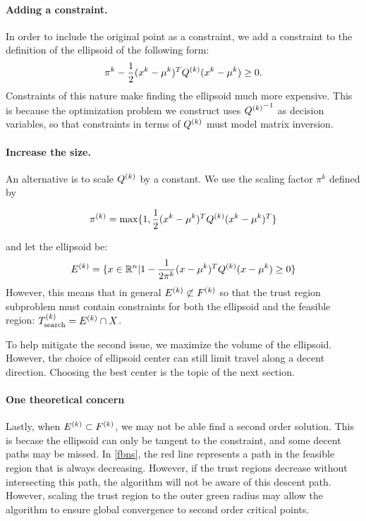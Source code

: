 
\paragraph{Adding a constraint.}
In order to include the original point as a constraint, we add a constraint to the definition of the ellipsoid of the following form:
$$ \pi^k - \frac 1 2 (x^k - \mu^{k})^T{Q^{(k)}}(x^k - \mu^{k}) \ge 0. $$
Constraints of this nature make finding the ellipsoid much more expensive.
This is because the optimization problem we construct uses ${{Q^{(k)}}}^{-1}$ as decision variables, so that constraints in terms of ${Q^{(k)}}$ must model matrix inversion.

\paragraph{Increase the size.}
An alternative is to scale ${Q^{(k)}}$ by a constant.
We use the scaling factor $\pi^k$ defined by

$$\pi^{(k)} = \max \{1, \frac 1 {2} (x^{k} - \mu^{k})^T {Q^{(k)}} (x^{k} - \mu^{k})^T \}$$

and let the ellipsoid be:
$${E^{(k)}} = \{x \in \mathbb R^n | 1 - \frac 1 {2\pi^k} (x - \mu^{k})^T {Q^{(k)}} (x - \mu^{k}) \ge 0\} $$
However, this means that in general ${E^{(k)}} \not \subset {F}^{(k)}$ so that the trust region subproblem must contain constraints for both the ellipsoid and the feasible region: ${T_{\text{search}}^{(k)}} = {E^{(k)}} \cap X$.

To help mitigate the second issue, we maximize the volume of the ellipsoid.
However, the choice of ellipsoid center can still limit travel along a decent direction.
Choosing the best center is the topic of the next section.

\paragraph{One theoretical concern}




Lastly, when ${E^{(k)}} \subset {F}^{(k)}$, we may not be able find a second order solution.
This is becase the ellipsoid can only be tangent to the constraint, and some decent paths may be missed.
In \cref{fbns}, the red line represents a path in the feasible region that is always decreasing.
However, if the trust regions decrease without intersecting this path, the algorithm will not be aware of this descent path.
However, scaling the trust region to the outer green radius may allow the algorithm to ensure global convergence to second order critical points.

